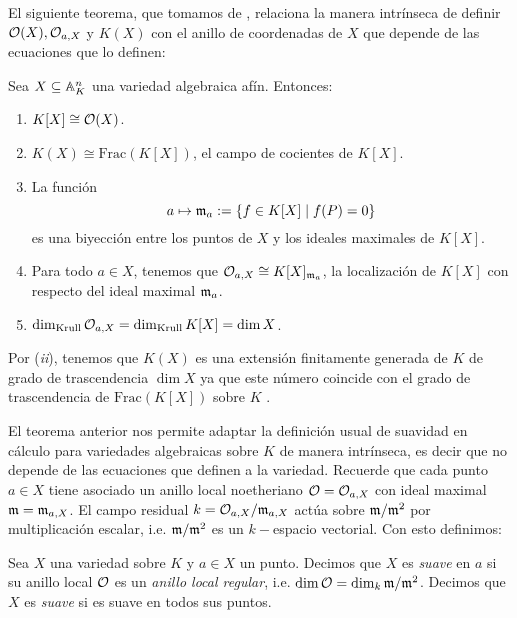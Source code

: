 El siguiente teorema, que tomamos de \cite{HartshorneAG}, relaciona la manera intrínseca de definir $\mathcal{O}(X),\mathcal{O}_{a,X}$ y $K(X)$ con el anillo de coordenadas de $X$ que depende de las ecuaciones que lo definen:

\begin{thm}\label{thm:prop-coord-X}
	Sea $X\subseteq\mathbb{A}^n_K$ una variedad algebraica afín. Entonces:
	\begin{enumerate}[label=(\roman*)]
		\item $K[X]\cong\mathcal{O}(X)$.
		\item $K(X)\cong\mathrm{Frac}(K[X])$, el campo de cocientes de $K[X]$.
		\item La función
		\[
			a \mapsto \mathfrak{m}_a:=\{f\in K[X]\mid f(P)=0\}
		\]
		es una biyección entre los puntos de $X$ y los ideales maximales de $K[X]$.
		\item Para todo $a\in X$, tenemos que $\mathcal{O}_{a,X}\cong K[X]_{\mathfrak{m}_a}$, la localización de $K[X]$ con respecto del ideal maximal $\mathfrak{m}_a$.
		\item\label{dim-local-ring} $\dim_{\mathrm{Krull}}\mathcal{O}_{a,X}=\dim_{\mathrm{Krull}}K[X]=\dim X$.
	\end{enumerate}
\end{thm}

\begin{nota}
	Por (\emph{ii}), tenemos que $K(X)$ es una extensión finitamente generada de $K$ de grado de trascendencia $\dim X$ ya que este número coincide con el grado de trascendencia de $\mathrm{Frac}(K[X])$ sobre $K$ \cite[\S14]{MatsumuraCA}.
\end{nota}

El teorema anterior nos permite adaptar la definición usual de suavidad en cálculo para variedades algebraicas sobre $K$ de manera intrínseca, es decir que no depende de las ecuaciones que definen a la variedad. Recuerde que cada punto $a\in X$ tiene asociado un anillo local noetheriano $\mathcal{O}=\mathcal{O}_{a,X}$ con ideal maximal $\mathfrak{m}=\mathfrak{m}_{a,X}$. El campo residual $k=\mathcal{O}_{a,X}/\mathfrak{m}_{a,X}$ actúa sobre $\mathfrak{m}/\mathfrak{m}^2$ por multiplicación escalar, i.e. $\mathfrak{m}/\mathfrak{m}^2$ es un $k-$espacio vectorial. Con esto definimos:

\begin{defin}
	Sea $X$ una variedad sobre $K$ y $a\in X$ un punto. Decimos que $X$ es \emph{suave} en $a$ si su anillo local $\mathcal{O}$ es un \emph{anillo local regular}, i.e. $\dim\mathcal{O}=\dim_k \mathfrak{m}/\mathfrak{m}^2$. Decimos que $X$ es \emph{suave} si es suave en todos sus puntos.
\end{defin}

